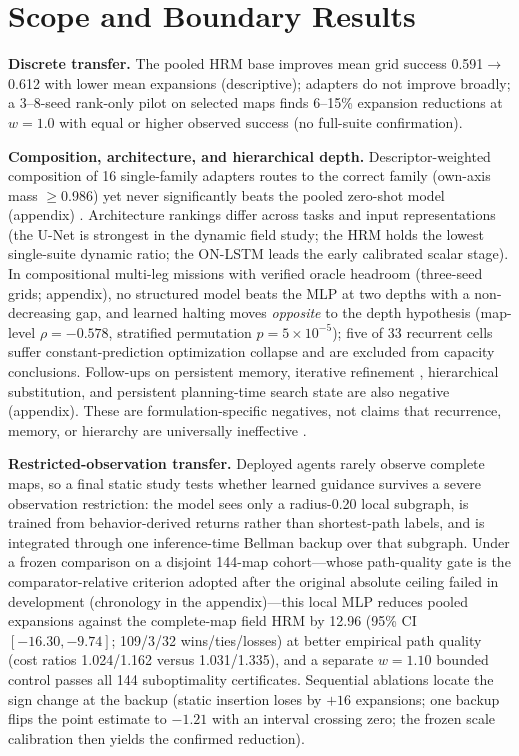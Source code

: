 \documentclass[letterpaper]{article} %
\begin{document}
\section{Scope and Boundary Results}

\textbf{Discrete transfer.} The pooled HRM base improves mean grid success 0.591$\to$0.612 with lower mean expansions (descriptive); adapters do not improve broadly; a 3--8-seed rank-only pilot on selected maps finds 6--15\% expansion reductions at $w{=}1.0$ with equal or higher observed success (no full-suite confirmation).

\textbf{Composition, architecture, and hierarchical depth.} Descriptor-weighted composition of 16 single-family adapters routes to the correct family (own-axis mass $\geq$0.986) yet never significantly beats the pooled zero-shot model (appendix) \citep{wortsman2022soups,ilharco2022task}. Architecture rankings differ across tasks and input representations (the U-Net is strongest in the dynamic field study; the HRM holds the lowest single-suite dynamic ratio; the ON-LSTM leads the early calibrated scalar stage). In compositional multi-leg missions with verified oracle headroom (three-seed grids; appendix), no structured model beats the MLP at two depths with a non-decreasing gap, and learned halting moves \emph{opposite} to the depth hypothesis (map-level $\rho=-0.578$, stratified permutation $p=5\times10^{-5}$); five of 33 recurrent cells suffer constant-prediction optimization collapse and are excluded from capacity conclusions. Follow-ups on persistent memory, iterative refinement \citep{tamar2016vin,lee2018gppn}, hierarchical substitution, and persistent planning-time search state are also negative (appendix). These are formulation-specific negatives, not claims that recurrence, memory, or hierarchy are universally ineffective \citep{jolicoeur2025trm,czechowski2021subgoal}.

\textbf{Restricted-observation transfer.} Deployed agents rarely observe complete maps, so a final static study tests whether learned guidance survives a severe observation restriction: the model sees only a radius-0.20 local subgraph, is trained from behavior-derived returns rather than shortest-path labels, and is integrated through one inference-time Bellman backup over that subgraph. Under a frozen comparison on a disjoint 144-map cohort---whose path-quality gate is the comparator-relative criterion adopted after the original absolute ceiling failed in development (chronology in the appendix)---this local MLP reduces pooled expansions against the complete-map field HRM by 12.96 (95\% CI $[-16.30,-9.74]$; 109/3/32 wins/ties/losses) at better empirical path quality (cost ratios 1.024/1.162 versus 1.031/1.335), and a separate $w{=}1.10$ bounded control passes all 144 suboptimality certificates. Sequential ablations locate the sign change at the backup (static insertion loses by $+16$ expansions; one backup flips the point estimate to $-1.21$ with an interval crossing zero; the frozen scale calibration then yields the confirmed reduction).
\end{document}
